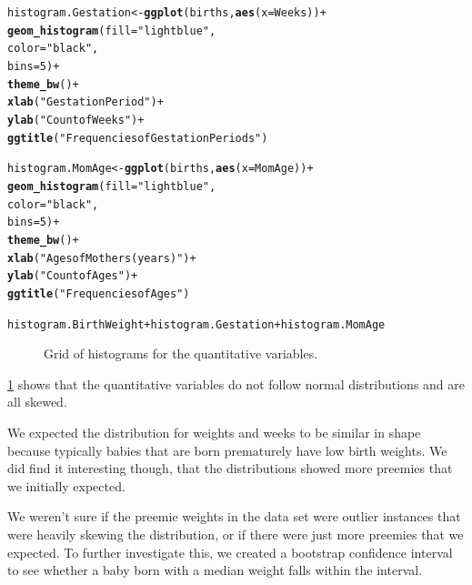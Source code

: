 \documentclass{article}\usepackage[]{graphicx}\usepackage[]{xcolor}
\makeatletter
\newcommand{\hlnum}[1]{\textcolor[rgb]{0.686,0.059,0.569}{#1}}%
\newcommand{\hlstr}[1]{\textcolor[rgb]{0.192,0.494,0.8}{#1}}%
\newcommand{\hlopt}[1]{\textcolor[rgb]{0,0,0}{#1}}%
\newcommand{\hlstd}[1]{\textcolor[rgb]{0.345,0.345,0.345}{#1}}%
\newcommand{\hlkwb}[1]{\textcolor[rgb]{0.69,0.353,0.396}{#1}}%
\newcommand{\hlkwc}[1]{\textcolor[rgb]{0.333,0.667,0.333}{#1}}%
\newcommand{\hlkwd}[1]{\textcolor[rgb]{0.737,0.353,0.396}{\textbf{#1}}}%
\newenvironment{kframe}{%
 \def\at@end@of@kframe{}%
 \ifinner\ifhmode%
  \def\at@end@of@kframe{\end{minipage}}%
  \begin{minipage}{\columnwidth}%
 \fi\fi%
 \def\FrameCommand##1{\hskip\@totalleftmargin \hskip-\fboxsep
 \colorbox{shadecolor}{##1}\hskip-\fboxsep
     \hskip-\linewidth \hskip-\@totalleftmargin \hskip\columnwidth}%
 \MakeFramed {\advance\hsize-\width
   \@totalleftmargin\z@ \linewidth\hsize
   \@setminipage}}%
 {\par\unskip\endMakeFramed%
 \at@end@of@kframe}
\newenvironment{knitrout}{}{} %
\makeatother
\begin{document}
\begin{enumerate}[a.]
\begin{knitrout}
\begin{kframe}
\begin{alltt}
\hlstd{histogram.Gestation}\hlkwb{<-} \hlkwd{ggplot}\hlstd{(births,} \hlkwd{aes}\hlstd{(}\hlkwc{x}\hlstd{=Weeks))}\hlopt{+}
  \hlkwd{geom_histogram}\hlstd{(}\hlkwc{fill} \hlstd{=} \hlstr{"lightblue"}\hlstd{,}
                 \hlkwc{color} \hlstd{=} \hlstr{"black"}\hlstd{,}
                 \hlkwc{bins} \hlstd{=} \hlnum{5}\hlstd{)} \hlopt{+}
  \hlkwd{theme_bw}\hlstd{()} \hlopt{+}
  \hlkwd{xlab}\hlstd{(}\hlstr{"Gestation Period"}\hlstd{)}\hlopt{+}
  \hlkwd{ylab}\hlstd{(}\hlstr{"Count of Weeks"}\hlstd{)}\hlopt{+}
  \hlkwd{ggtitle}\hlstd{(}\hlstr{"Frequencies of Gestation Periods"}\hlstd{)}

\hlstd{histogram.MomAge} \hlkwb{<-} \hlkwd{ggplot}\hlstd{(births,} \hlkwd{aes}\hlstd{(}\hlkwc{x}\hlstd{=MomAge))}\hlopt{+}
  \hlkwd{geom_histogram}\hlstd{(}\hlkwc{fill} \hlstd{=} \hlstr{"lightblue"}\hlstd{,}
                 \hlkwc{color} \hlstd{=} \hlstr{"black"}\hlstd{,}
                 \hlkwc{bins} \hlstd{=} \hlnum{5}\hlstd{)} \hlopt{+}
  \hlkwd{theme_bw}\hlstd{()} \hlopt{+}
  \hlkwd{xlab}\hlstd{(}\hlstr{"Ages of Mothers(years)"}\hlstd{)}\hlopt{+}
  \hlkwd{ylab}\hlstd{(}\hlstr{"Count of Ages"}\hlstd{)}\hlopt{+}
  \hlkwd{ggtitle}\hlstd{(}\hlstr{"Frequencies of Ages"}\hlstd{)}

\hlstd{histogram.BirthWeight} \hlopt{+} \hlstd{histogram.Gestation} \hlopt{+} \hlstd{histogram.MomAge}
\end{alltt}
\end{kframe}
\end{knitrout}

\begin{figure}[H]
\centering

\caption{Grid of histograms for the quantitative variables.}
\label{HistogramSummary}
\end{figure}

\ref{HistogramSummary} shows that the quantitative variables do not follow normal distributions and are all skewed. 

We expected the distribution for weights and weeks to be similar in shape because typically babies that are born prematurely have low birth weights. We did find it interesting though, that the distributions showed more preemies that we initially expected. 

We weren't sure if the preemie weights in the data set were outlier instances that were heavily skewing the distribution, or if there were just more preemies that we expected. To further investigate this, we created a bootstrap confidence interval to see whether a baby born with a median weight falls within the interval. 


\end{enumerate}
\end{document}
